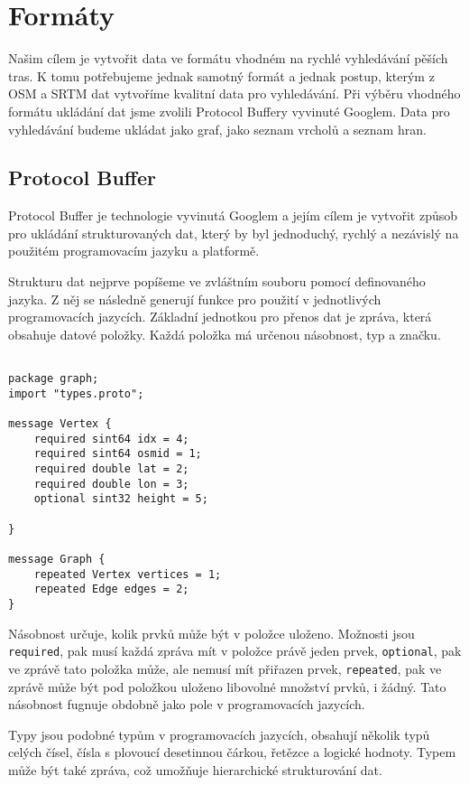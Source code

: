 \chapter{Formáty}
Našim cílem je vytvořit data ve formátu vhodném na rychlé vyhledávání pěších
tras. K tomu potřebujeme jednak samotný formát a jednak postup, kterým z OSM a
SRTM dat vytvoříme kvalitní data pro vyhledávání. Při výběru vhodného formátu
ukládání dat jsme zvolili Protocol Buffery\cite{pbfweb} vyvinuté Googlem. Data
pro vyhledávání budeme ukládat jako graf, jako seznam vrcholů a seznam hran.



\section{Protocol Buffer}
Protocol Buffer je technologie vyvinutá Googlem a jejím cílem je vytvořit způsob
pro ukládání strukturovaných dat, který by byl jednoduchý, rychlý a nezávislý na
použitém programovacím jazyku a platformě. 

Strukturu dat nejprve popíšeme ve zvláštním souboru pomocí definovaného
jazyka\cite{pbfspec}. Z něj se následně generují funkce pro použití v
jednotlivých programovacích jazycích. Základní jednotkou pro přenos dat je
zpráva, která obsahuje datové položky. Každá položka má určenou násobnost, typ a
značku.

\begin{verbatim}

package graph;
import "types.proto";

message Vertex {
    required sint64 idx = 4;
    required sint64 osmid = 1;
    required double lat = 2;
    required double lon = 3;
    optional sint32 height = 5;
    
}

message Graph {
    repeated Vertex vertices = 1;
    repeated Edge edges = 2;
}
\end{verbatim}

{\tuc Násobnost} určuje, kolik prvků může být v položce uloženo. Možnosti jsou
\verb|required|, pak musí každá zpráva mít v položce právě jeden prvek,
\verb|optional|, pak ve zprávě tato položka může, ale nemusí mít přiřazen prvek,
\verb|repeated|, pak ve zprávě může být pod položkou uloženo libovolné množství
prvků, i žádný. Tato násobnost fugnuje obdobně jako pole v programovacích
jazycích. 

{\tuc Typy} jsou podobné typům v programovacích jazycích, obsahují několik typů celých
čísel, čísla s plovoucí desetinnou čárkou, řetězce a logické hodnoty. Typem může
být také zpráva, což umožňuje hierarchické strukturování dat. 

